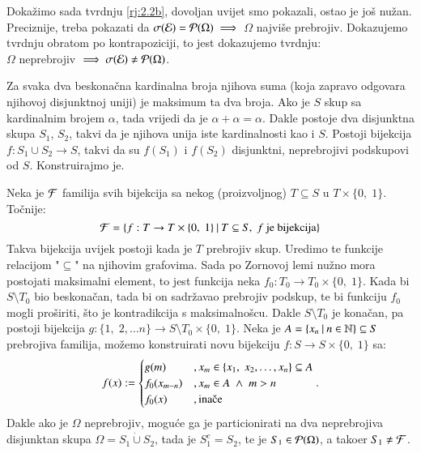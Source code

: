 \begin{rj}
    Doka\v zimo sada tvrdnju \ref{rj:2.2b}, dovoljan uvijet smo pokazali, ostao je jo\v s nu\v zan.
    Preciznije, treba pokazati da $\sigma({\mathcal{E}}) = \mathcal{P}({\Omega}) \implies$ $\Omega$ najvi\v se prebrojiv.
    Dokazujemo tvrdnju obratom po kontrapoziciji, to jest dokazujemo tvrdnju:\\
    $\Omega$ neprebrojiv $\implies \sigma({\mathcal{E}}) \neq \mathcal{P}({\Omega})$.

    Za svaka dva beskona\v cna kardinalna broja njihova suma (koja zapravo odgovara njihovoj disjunktnoj uniji) je maksimum ta dva broja.
    Ako je $S$ skup sa kardinalnim brojem $\alpha$, tada vrijedi da je $\alpha + \alpha = \alpha$.
    Dakle postoje dva disjunktna skupa $S_1$, $S_2$, takvi da je njihova unija iste kardinalnosti kao i $S$.
    Postoji bijekcija $f: S_1 \cup S_2 \to S$, takvi da su $f(S_1)$ i $f(S_2)$ disjunktni, neprebrojivi podskupovi od $S$. Konstruirajmo je.

    Neka je $\mathcal{F}$ familija svih bijekcija sa nekog (proizvoljnog) $T \subseteq S$ u $T \times \{0, \; 1\}$.
    To\v cnije:
    \begin{equation*}
        \mathcal{F} = \{{f: T \to T \times \{0, \; 1\}} \: | \: {T \subseteq S, \; f \textnormal{ je bijekcija}}\}
    \end{equation*}
    Takva bijekcija uvijek postoji kada je $T$ prebrojiv skup.
    Uredimo te funkcije relacijom "$\subseteq$" na njihovim grafovima.
    Sada po Zornovoj lemi nu\v zno mora postojati maksimalni element, to jest funkcija neka $f_0: T_0 \to T_0 \times \{0, \; 1\}$.
    Kada bi $S \setminus T_0$ bio beskona\v can, tada bi on sadr\v zavao prebrojiv podskup, te bi funkciju $f_0$ mogli pro\v siriti, \v sto je kontradikcija s maksimalno\v scu.
    Dakle $S \setminus T_0$ je kona\v can, pa postoji bijekcija $g: \{1, \; 2, \ldots n\} \to S \setminus T_0 \times \{0, \; 1\}$.
    Neka je $A = \{{x_n} \: | \: {n \in \mathbb{N}}\} \subseteq S$ prebrojiva familija, mo\v zemo konstruirati novu bijekciju
    $f : S \to S \times \{0, \; 1\}$ sa:
    \begin{equation*}
        f(x) :=
        \begin{cases}
            g(m)    &, x_m \in \{ x_1, \; x_2, \ldots, x_n \} \subseteq A\\
            f_0(x_{m - n})  &, x_m \in A \; \land \; m > n\\
            f_0(x)  &, \textnormal{ina\v ce}
        \end{cases}.
    \end{equation*}
    Dakle ako je $\Omega$ neprebrojiv, mogu\' ce ga je particionirati na dva neprebrojiva disjunktan skupa $\Omega = S_1 \dot{\cup} S_2$, tada je $S_1^c = S_2$, te je $S_1 \in \mathcal{P}({\Omega})$, a tako\dj er $S_1 \neq \mathcal{F}$.
\end{rj}


